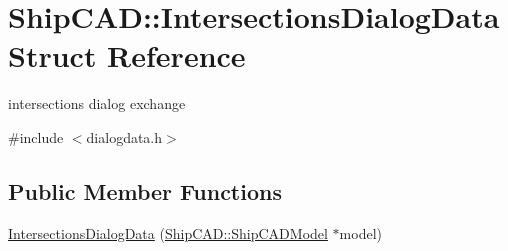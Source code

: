 \hypertarget{structShipCAD_1_1IntersectionsDialogData}{}\section{Ship\+C\+AD\+:\+:Intersections\+Dialog\+Data Struct Reference}
\label{structShipCAD_1_1IntersectionsDialogData}


intersections dialog exchange  




{\ttfamily \#include $<$dialogdata.\+h$>$}

\subsection*{Public Member Functions}
\begin{DoxyCompactItemize}
\item 
\hyperlink{structShipCAD_1_1IntersectionsDialogData_a7590ecffa4f48488a42135b41ad6eb51}{Intersections\+Dialog\+Data} (\hyperlink{classShipCAD_1_1ShipCADModel}{Ship\+C\+A\+D\+::\+Ship\+C\+A\+D\+Model} $\ast$model)
\end{DoxyCompactItemize}
